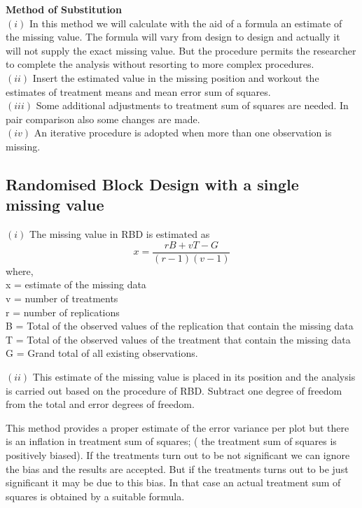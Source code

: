 \documentclass[
]{book}
\begin{document}
\textbf{Method of Substitution}\\
\((i)\) In this method we will calculate with the aid of a formula an estimate of the missing value. The formula will vary from design to design and actually it will not supply the exact missing value. But the procedure permits the researcher to complete the analysis without resorting to more complex procedures.\\
\((ii)\) Insert the estimated value in the missing position and workout the estimates of treatment means and mean error sum of squares.\\
\((iii)\) Some additional adjustments to treatment sum of squares are needed. In pair comparison also some changes are made.\\
\((iv)\) An iterative procedure is adopted when more than one observation is missing.

\hypertarget{randomised-block-design-with-a-single-missing-value}{%
\subsection{Randomised Block Design with a single missing value}\label{randomised-block-design-with-a-single-missing-value}}

\((i)\) The missing value in RBD is estimated as
\[x=\frac{rB+vT-G}{(r-1)(v-1)}\]
where,\\
x = estimate of the missing data\\
v = number of treatments\\
r = number of replications\\
B = Total of the observed values of the replication that contain the missing data\\
T = Total of the observed values of the treatment that contain the missing data\\
G = Grand total of all existing observations.

\((ii)\) This estimate of the missing value is placed in its position and the analysis is carried out based on the procedure of RBD. Subtract one degree of freedom from the total and error degrees of freedom.

This method provides a proper estimate of the error variance per plot but there
is an inflation in treatment sum of squares; ( the treatment sum of squares is positively biased). If the treatments turn out to be not significant we can ignore the bias and the results are accepted. But if the treatments turns out to be just significant it may be due to this bias. In that case an actual treatment sum of squares is obtained by a suitable formula.
\end{document}
